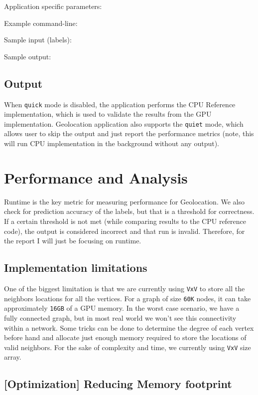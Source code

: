 \documentclass[10pt,article,oneside]{memoir}
\begin{document}
Application specific parameters:

Example command-line:

Sample input (labels):

Sample output:

\subsection{Output}\label{output}

When \texttt{quick} mode is disabled, the application performs the CPU
Reference implementation, which is used to validate the results from the
GPU implementation. Geolocation application also supports the
\texttt{quiet} mode, which allows user to skip the output and just
report the performance metrics (note, this will run CPU implementation
in the background without any output).

\section{Performance and Analysis}\label{performance-and-analysis}

Runtime is the key metric for measuring performance for Geolocation. We
also check for prediction accuracy of the labels, but that is a
threshold for correctness. If a certain threshold is not met (while
comparing results to the CPU reference code), the output is considered
incorrect and that run is invalid. Therefore, for the report I will just
be focusing on runtime.

\subsection{Implementation
limitations}\label{implementation-limitations}

One of the biggest limitation is that we are currently using
\texttt{\textbar{}V\textbar{}x\textbar{}V\textbar{}} to store all the
neighbors locations for all the vertices. For a graph of size
\texttt{60K} nodes, it can take approximately \texttt{16GB} of a GPU
memory. In the worst case scenario, we have a fully connected graph, but
in most real world we won't see this connectivity within a network. Some
tricks can be done to determine the degree of each vertex before hand
and allocate just enough memory required to store the locations of valid
neighbors. For the sake of complexity and time, we currently using
\texttt{\textbar{}V\textbar{}x\textbar{}V\textbar{}} size array.

\subsection{{[}Optimization{]} Reducing Memory
footprint}\label{optimization-reducing-memory-footprint}
\end{document}
